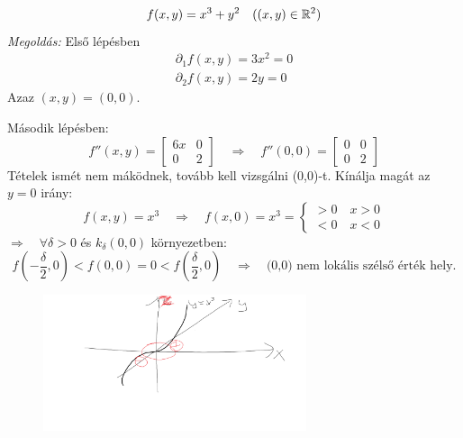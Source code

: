 \documentclass[a4paper,11.5pt]{article}
\begin{document}
	\begin{task}
		\[ f(x,y)=x^3+y^2\quad ((x,y)\in\mathbb{R}^2) \]
		\textit{Megoldás:} Első lépésben
		\begin{align*}
			\partial_1f(x,y)=3x^2=0\\
			\partial_2f(x,y)=2y=0
		\end{align*}
		Azaz $(x,y)=(0,0)$.
		
		Második lépésben:
		\[ f''(x,y)=\begin{bmatrix}
			6x&0\\
			0&2
		\end{bmatrix}\quad \Rightarrow\quad f''(0,0)=\begin{bmatrix}
			0&0\\
			0&2
		\end{bmatrix} \]
		Tételek ismét nem máködnek, tovább kell vizsgálni (0,0)-t. Kínálja magát az $y=0$ irány:
		\[ f(x,y)=x^3\quad \Rightarrow\quad f(x,0)=x^3=\begin{cases}
			>0\quad x>0\\
			<0\quad x<0
		\end{cases} \]
		$\Rightarrow\quad \forall\delta>0$ és $k_\delta(0,0)$ környezetben:
		\[ f\left(-\frac{\delta}{2},0\right)<f(0,0)=0<f\left(\frac{\delta}{2},0\right)\quad \Rightarrow\quad \text{(0,0) nem lokális szélső érték hely.} \]
		\begin{figure}[H]
			\centering
			\includegraphics[height=4cm]{../2zh/kepek/45.png}
			\caption{}
		\end{figure}
	\end{task}
\end{document}
